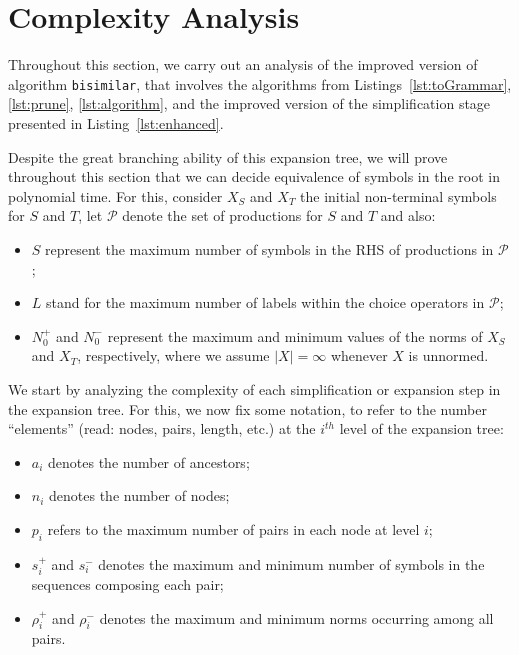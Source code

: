 \section{Complexity Analysis}
\label{sec:complexity}

Throughout this section, we carry out an analysis of the
improved version of algorithm \lstinline{bisimilar},
that involves the algorithms from Listings~\ref{lst:toGrammar},
\ref{lst:prune}, \ref{lst:algorithm}, and the improved version
of the simplification stage presented in Listing~\ref{lst:enhanced}.



Despite the great branching ability of this expansion tree, 
we will prove throughout this section that we can decide 
equivalence of symbols in the root in polynomial time. 
For this, consider $X_S$ and
$X_T$ the initial non-terminal symbols for $S$ and $T$, let 
$\mathcal{P}$ denote the set of productions for $S$ and $T$ and 
also:
\begin{itemize}
	\item $S$ represent the maximum number of symbols in the RHS
	      of productions in $\mathcal{P}$;
	\item $L$ stand for the maximum number of labels within the choice 
		  operators in $\mathcal{P}$;
	\item $N_0^+$ and $N_0^-$ represent the maximum and minimum values
		  of the norms of $X_S$ and $X_T$, respectively, where we 
		  assume $|X|=\infty$ whenever $X$ is unnormed.
\end{itemize}

We start by analyzing the complexity of each simplification or expansion 
step in the expansion tree. For this, we now fix some notation, to 
refer to the number ``elements'' (read: nodes, pairs, length, etc.)
at the $i^{th}$ level of the expansion tree:
\begin{itemize}
	\item $a_i$ denotes the number of ancestors;
	\item $n_i$ denotes the number of nodes;
	\item $p_i$ refers to the maximum number of pairs in each node
				at level $i$;
	\item $s_i^+$ and $s_i^-$ denotes the maximum and minimum 
		  number of symbols in the sequences composing each pair;
	\item $\rho_i^+$ and $\rho_i^-$ denotes the maximum and minimum
		  norms occurring among all pairs.
\end{itemize}

